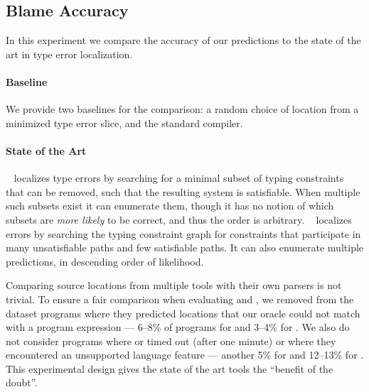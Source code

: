 \subsection{Blame Accuracy}
\label{sec:quantitative}

In this experiment we compare the accuracy of our predictions to the
state of the art in type error localization.

\paragraph{Baseline}
We provide two baselines for the comparison: a random choice of location
from a minimized type error slice, and the standard \ocaml compiler. 

\paragraph{State of the Art}
\mycroft~\citep{Loncaric2016-uk} localizes type errors by searching for
a minimal subset of typing constraints that can be removed, such that
the resulting system is satisfiable.
%
When multiple such subsets exist it can enumerate them, though it has no
notion of which subsets are \emph{more likely} to be correct, and thus
the order is arbitrary.
%
\sherrloc~\citep{Zhang2014-lv} localizes errors by searching the typing
constraint graph for constraints that participate in many unsatisfiable
paths and few satisfiable paths.
%
It can also enumerate multiple predictions, in descending order of
likelihood.

Comparing source locations from multiple tools with their own parsers is
not trivial.
%
To ensure a fair comparison when evaluating \mycroft and
\sherrloc, we removed from the dataset programs where they predicted
locations that our oracle could not match with a program expression ---
6--8\% of programs for \mycroft and 3--4\% for \sherrloc.
%
We also do not consider programs where \mycroft or \sherrloc timed out
(after one minute) or where they encountered an unsupported language
feature --- another 5\% for \mycroft and 12--13\% for \sherrloc. This
experimental design gives the state of the art tools the ``benefit of the
doubt''.


